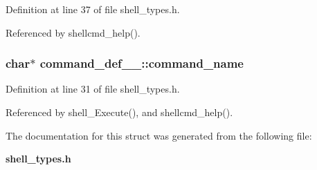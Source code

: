 Definition at line 37 of file shell\_\-types.h.

Referenced by shellcmd\_\-help().
\subsubsection{\setlength{\rightskip}{0pt plus 5cm}char$\ast$ {\bf command\_\-def\_\-\_\-::command\_\-name}}\label{structcommand__def_____o0}




Definition at line 31 of file shell\_\-types.h.

Referenced by shell\_\-Execute(), and shellcmd\_\-help().

The documentation for this struct was generated from the following file:\begin{CompactItemize}
\item 
{\bf shell\_\-types.h}\end{CompactItemize}
